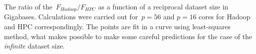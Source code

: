 \documentclass{article}
\begin{document}
\begin{center}

\end{center}
The ratio of the~$F_{Hadoop}/F_{HPC}$ as a function of a reciprocal dataset size in Gigabases.  Calculations were carried out for~$p=56$ and $p=16$ cores for Hadoop and HPC correspondingly.
The points are fit in a curve  using least-squares method, what makes  possible to make some careful predictions for the case of the {\it infinite} dataset size.
\end{document}
